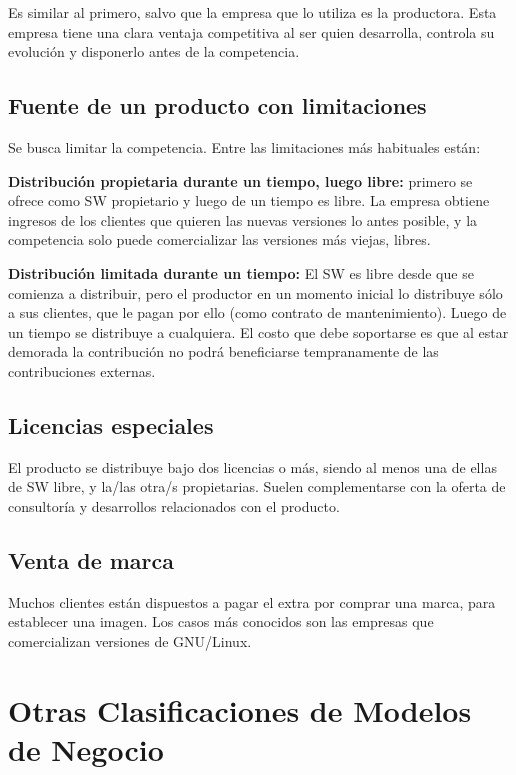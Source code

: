 Es similar al primero, salvo que la empresa que lo utiliza es la productora. Esta empresa tiene una clara ventaja competitiva al ser quien desarrolla, controla su evolución y disponerlo antes de la competencia. 

\subsection{Fuente de un producto con limitaciones}

Se busca limitar la competencia. Entre las limitaciones más habituales están:

{\bf Distribución propietaria durante un tiempo, luego libre: } primero se ofrece como SW propietario y luego de un tiempo es libre. La empresa obtiene ingresos de los clientes que quieren las nuevas versiones lo antes posible, y la competencia solo puede comercializar las versiones más viejas, libres.

{\bf Distribución limitada durante un tiempo: } El SW es libre desde que se comienza a distribuir, pero el productor en un momento inicial lo distribuye sólo a sus clientes, que le pagan por ello (como contrato de mantenimiento). Luego de un tiempo se distribuye a cualquiera. El costo que debe soportarse es que al estar demorada la contribución no podrá beneficiarse tempranamente de las contribuciones externas.

\subsection{Licencias especiales}

El producto se distribuye bajo dos licencias o más, siendo al menos una de ellas de SW libre, y la/las otra/s propietarias. Suelen complementarse con la oferta de consultoría y desarrollos relacionados con el producto.

\subsection{Venta de marca}

Muchos clientes están dispuestos a pagar el extra por comprar una marca, para establecer una imagen. 
Los casos más conocidos son las empresas que comercializan versiones de GNU/Linux.


\section{Otras Clasificaciones de Modelos de Negocio}

